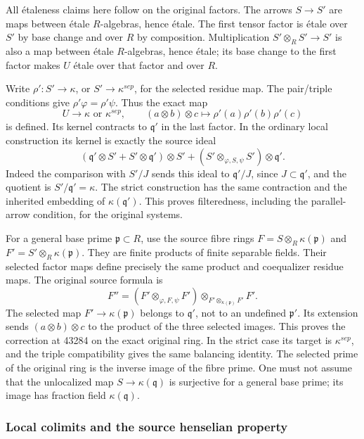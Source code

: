 All étaleness claims here follow on the original factors. The arrows \(S\to S'\) are maps between étale \(R\)-algebras, hence étale. The first tensor factor is étale over \(S'\) by base change and over \(R\) by composition. Multiplication \(S'\otimes_R S'\to S'\) is also a map between étale \(R\)-algebras, hence étale; its base change to the first factor makes \(U\) étale over that factor and over \(R\).

Write \(\rho':S'\to\kappa\), or \(S'\to\kappa^{sep}\), for the selected residue map. The pair/triple conditions give \(\rho'\varphi=\rho'\psi\). Thus the exact map \[
 U\longrightarrow\kappa\text{ or }\kappa^{sep},\qquad
 (a\otimes b)\otimes c\longmapsto\rho'(a)\rho'(b)\rho'(c)
\] is defined. Its kernel contracts to \(\mathfrak q'\) in the last factor. In the ordinary local construction its kernel is exactly the source ideal \[
 (\mathfrak q'\otimes S'+S'\otimes\mathfrak q')\otimes S'
 +(S'\otimes_{\varphi,S,\psi}S')\otimes\mathfrak q'.
\] Indeed the comparison with \(S'/J\) sends this ideal to \(\mathfrak q'/J\), since \(J\subset\mathfrak q'\), and the quotient is \(S'/\mathfrak q'=\kappa\). The strict construction has the same contraction and the inherited embedding of \(\kappa(\mathfrak q')\). This proves filteredness, including the parallel-arrow condition, for the original systems.

For a general base prime \(\mathfrak p\subset R\), use the source fibre rings \(F=S\otimes_R\kappa(\mathfrak p)\) and \(F'=S'\otimes_R\kappa(\mathfrak p)\). They are finite products of finite separable fields. Their selected factor maps define precisely the same product and coequalizer residue maps. The original source formula is \[
 F''=(F'\otimes_{\varphi,F,\psi}F')
       \otimes_{F'\otimes_{\kappa(\mathfrak p)}F'}F'.
\] The selected map \(F'\to\kappa(\mathfrak p)\) belongs to \(\mathfrak q'\), not to an undefined \(\mathfrak p'\). Its extension sends \((a\otimes b)\otimes c\) to the product of the three selected images. This proves the correction at 43284 on the exact original ring. In the strict case its target is \(\kappa^{sep}\), and the triple compatibility gives the same balancing identity. The selected prime of the original ring is the inverse image of the fibre prime. One must not assume that the unlocalized map \(S\to\kappa(\mathfrak q)\) is surjective for a general base prime; its image has fraction field \(\kappa(\mathfrak q)\).

\subsubsection{Local colimits and the source henselian property}\label{algebra-proof-060-local-colimits-and-the-source-henselian-property}

